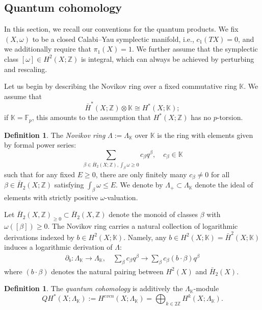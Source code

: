 \documentclass[reqno]{amsart}
\numberwithin{equation}{section}
\numberwithin{equation}{section}
\numberwithin{equation}{section}
\theoremstyle{definition}
\newtheorem{defn}[thm]{Definition}
\theoremstyle{remark}
\theoremstyle{remark}
\begin{document}
\subsection{Quantum cohomology}\label{ssec:qh}

In this section, we recall our conventions for the quantum products. We fix $(X, \omega)$ to be a closed Calabi--Yau symplectic manifold, i.e., $c_1(TX) = 0$, and we additionally require that $\pi_1(X) = 1$. We further assume that the symplectic class $[\omega] \in H^2(X;\mathbb{Z})$ is integral, which can always be achieved by perturbing and rescaling. 

Let us begin by describing the Novikov ring over a fixed commutative ring $\mathbb{K}$. We assume that $$\bar{H}^*(X;\mathbb{Z}) \otimes \mathbb{K} \cong H^*(X;\mathbb{K});$$ if $\mathbb{K} = \mathbb{F}_p$, this amounts to the assumption that $H^*(X;\mathbb{Z})$ has no $p$-torsion.

\begin{defn}
The \emph{Novikov ring} $\Lambda:= \Lambda_{\mathbb{K}}$ over $\mathbb{K}$ is the ring with elements given by formal power series:
\begin{equation}
\sum_{\beta \in \bar{H}_2(X; \mathbb{Z}), \int_\beta \omega \geq 0} c_\beta q^\beta, \quad c_\beta \in \mathbb{K}
\end{equation}
such that for any fixed $E \geq 0$, there are only finitely many $c_\beta \neq 0$ for all $\beta \in \bar{H}_2(X; \mathbb{Z})$ satisfying $\int_\beta \omega \leq E$. We denote by  $\Lambda_{+} \subset \Lambda_{\mathbb{K}}$ denote the ideal of elements with strictly positive $\omega$-valuation. 
\end{defn}

 Let $\bar{H}_2(X,\mathbb{Z})_{\geq 0} \subset \bar{H}_2(X,\mathbb{Z})$ denote the monoid of classes $\beta$ with $\omega([\beta]) \geq 0.$ The Novikov ring carries a natural collection of logarithmic derivations indexed by $b \in H^2(X;\mathbb{K})$. Namely, any $b \in H^2(X;\mathbb{K}) = \bar{H}^2(X;\mathbb{K})$ induces a logarithmic derivation of $\Lambda$:
\begin{align}
\partial_b : \Lambda_\mathbb{K} \to \Lambda_\mathbb{K}, \quad
\sum_\beta c_\beta q^\beta \to \sum_\beta c_\beta (b \cdot \beta) q^\beta \nonumber
\end{align}
where $(b \cdot \beta)$ denotes the natural pairing between $H^2(X)$ and $\bar{H}_2(X)$.

\begin{defn}
    The \emph{quantum cohomology} is additively the $\Lambda_{\mathbb{K}}$-module
    \begin{equation}
        QH^*(X;\Lambda_{\mathbb{K}}) := H^{even}(X;\Lambda_{\mathbb{K}}) = \bigoplus_{k \in 2 \mathbb{Z}} H^k (X;\Lambda_{\mathbb{K}}).
    \end{equation}
\end{defn}
\end{document}
